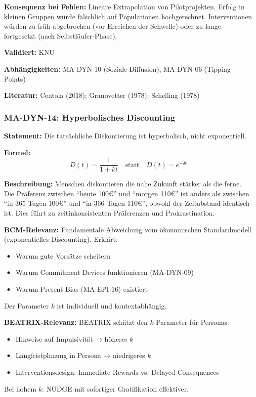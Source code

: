 \textbf{Konsequenz bei Fehlen:}
Lineare Extrapolation von Pilotprojekten. Erfolg in kleinen Gruppen würde fälschlich auf Populationen hochgerechnet. Interventionen würden zu früh abgebrochen (vor Erreichen der Schwelle) oder zu lange fortgesetzt (nach Selbstläufer-Phase).

\textbf{Validiert:} KNU

\textbf{Abhängigkeiten:} MA-DYN-10 (Soziale Diffusion), MA-DYN-06 (Tipping Points)

\textbf{Literatur:} Centola (2018); Granovetter (1978); Schelling (1978)


\subsubsection*{MA-DYN-14: Hyperbolisches Discounting}

\textbf{Statement:} Die tatsächliche Diskontierung ist hyperbolisch, nicht exponentiell.

\textbf{Formel:}
\begin{equation}
D(t) = \frac{1}{1 + kt} \quad \text{statt} \quad D(t) = e^{-\delta t}
\end{equation}

\textbf{Beschreibung:}
Menschen diskontieren die nahe Zukunft stärker als die ferne. Die Präferenz zwischen ``heute 100€'' und ``morgen 110€'' ist anders als zwischen ``in 365 Tagen 100€'' und ``in 366 Tagen 110€'', obwohl der Zeitabstand identisch ist. Dies führt zu zeitinkonsistenten Präferenzen und Prokrastination.

\textbf{BCM-Relevanz:}
Fundamentale Abweichung vom ökonomischen Standardmodell (exponentielles Discounting). Erklärt:
\begin{itemize}
    \item Warum gute Vorsätze scheitern
    \item Warum Commitment Devices funktionieren (MA-DYN-09)
    \item Warum Present Bias (MA-EPI-16) existiert
\end{itemize}
Der Parameter $k$ ist individuell und kontextabhängig.

\textbf{BEATRIX-Relevanz:}
BEATRIX schätzt den $k$-Parameter für Personas:
\begin{itemize}
    \item Hinweise auf Impulsivität → höheres $k$
    \item Langfristplanung in Persona → niedrigeres $k$
    \item Interventionsdesign: Immediate Rewards vs. Delayed Consequences
\end{itemize}
Bei hohem $k$: NUDGE mit sofortiger Gratifikation effektiver.


